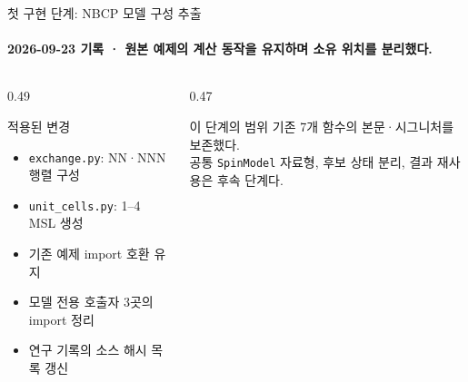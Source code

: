 \begin{frame}[label=implemented]{첫 구현 단계: NBCP 모델 구성 추출}
  \framesubtitle{2026-09-23 기록 · 원본 예제의 계산 동작을 유지하며 소유 위치를 분리했다.}
  \begin{columns}[T,onlytextwidth]
    \begin{column}{0.49\textwidth}
      \begin{block}{적용된 변경}
        \begin{itemize}
          \item \texttt{exchange.py}: NN·NNN 행렬 구성
          \item \texttt{unit\_cells.py}: 1--4 MSL 생성
          \item 기존 예제 import 호환 유지
          \item 모델 전용 호출자 3곳의 import 정리
          \item 연구 기록의 소스 해시 목록 갱신
        \end{itemize}
      \end{block}
    \end{column}
    \begin{column}{0.47\textwidth}
      \begin{block}{이 단계의 범위}
        기존 7개 함수의 본문·시그니처를 보존했다.\\[0.8em]
        공통 \texttt{SpinModel} 자료형, 후보 상태 분리,
        결과 재사용은 후속 단계다.
      \end{block}
      \smallskip
    \end{column}
  \end{columns}
\end{frame}

